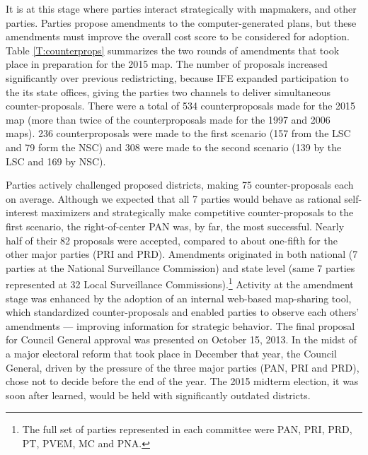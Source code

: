 \documentclass[letter,12pt]{article}
\begin{document}
It is at this stage where parties interact strategically with mapmakers, and other parties. Parties propose amendments to the computer-generated plans, but these amendments must improve the overall cost score to be considered for adoption. Table \ref{T:counterprops} summarizes the two rounds of amendments that took place in preparation for the 2015 map. The number of proposals increased significantly over previous redistricting, because IFE expanded participation to the its state offices, giving the parties two channels to deliver simultaneous counter-proposals. There were a total of 534 counterproposals made for the 2015 map (more than twice of the counterproposals made for the 1997 and 2006 maps). 236 counterproposals were made to the first scenario (157 from the LSC and 79 form the NSC) and 308 were made to the second scenario (139 by the LSC and 169 by NSC).



Parties actively challenged proposed districts, making 75 counter-proposals each on average. Although we expected that all 7 parties would behave as rational self-interest maximizers and strategically make competitive counter-proposals to the first scenario, the right-of-center PAN was, by far, the most successful. Nearly half of their 82 proposals were accepted, compared to about one-fifth for the other major parties (PRI and PRD). Amendments originated in both national (7 parties at the National Surveillance Commission) and state level (same 7 parties represented at 32 Local Surveillance Commissions).\footnote{The full set of parties represented in each committee were PAN, PRI, PRD, PT, PVEM, MC and PNA.} Activity at the amendment stage was enhanced by the adoption of an internal web-based map-sharing tool, which standardized counter-proposals and enabled parties to observe each others' amendments --- improving information for strategic behavior. The final proposal for Council General approval was presented on October 15, 2013. In the midst of a major electoral reform that took place in December that year, the Council General, driven by the pressure of the three major parties (PAN, PRI and PRD), chose not to decide before the end of the year. The 2015 midterm election, it was soon after learned, would be held with significantly outdated districts. 

\end{document}
